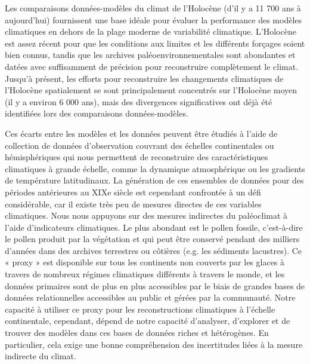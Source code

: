 \renewcommand{\abstractname}{Résumé}
\renewcommand{\univname}{\href{https://www.unil.ch}{Université de Lausanne}}
\renewcommand{\facname}{\href{https://www.unil.ch/gse}{Faculté des géosciences et de l'environnement}}
\renewcommand{\deptname}{\href{https://www.unil.ch/idyst/}{Institut des dynamiques de la surface terrestre}}
\renewcommand{\degreename}{Docteur ès Sciences}
\begin{thesisabstract}[]
\addchaptertocentry{\abstractname}
Les comparaisons données-modèles du climat de l'Holocène (d’il y a 11 700 ans à aujourd'hui) fournissent une base idéale pour évaluer la performance des modèles climatiques en dehors de la plage moderne de variabilité climatique. L'Holocène est assez récent pour que les conditions aux limites et les différents forçages soient bien connus, tandis que les archives paléoenvironnementales sont abondantes et datées avec suffisamment de précision pour reconstruire complètement le climat. Jusqu'à présent, les efforts pour reconstruire les changements climatiques de l'Holocène spatialement se sont principalement concentrés sur l'Holocène moyen (il y a environ 6 000 ans), mais des divergences significatives ont déjà été identifiées lors des comparaisons données-modèles.

Ces écarts entre les modèles et les données peuvent être étudiés à l'aide de collection de données d'observation couvrant des échelles continentales ou hémisphériques qui nous permettent de reconstruire des caractéristiques climatiques à grande échelle, comme la dynamique atmosphérique ou les gradients de température latitudinaux. La génération de ces ensembles de données pour des périodes antérieures au XIXe siècle est cependant confrontée à un défi considérable, car il existe très peu de mesures directes de ces variables climatiques. Nous nous appuyons sur des mesures indirectes du paléoclimat à l'aide d'indicateurs climatiques. Le plus abondant est le pollen fossile, c'est-à-dire le pollen produit par la végétation et qui peut être conservé pendant des milliers d'années dans des archives terrestres ou côtières (e.g. les sédiments lacustres). Ce « proxy » est disponible sur tous les continents non couverts par les glaces à travers de nombreux régimes climatiques différents à travers le monde, et les données primaires sont de plus en plus accessibles par le biais de grandes bases de données relationnelles accessibles au public et gérées par la communauté. Notre capacité à utiliser ce proxy pour les reconstructions climatiques à l'échelle continentale, cependant, dépend de notre capacité d'analyser, d'explorer et de trouver des modèles dans ces bases de données riches et hétérogènes. En particulier, cela exige une bonne compréhension des incertitudes liées à la mesure indirecte du climat.


\end{thesisabstract}
